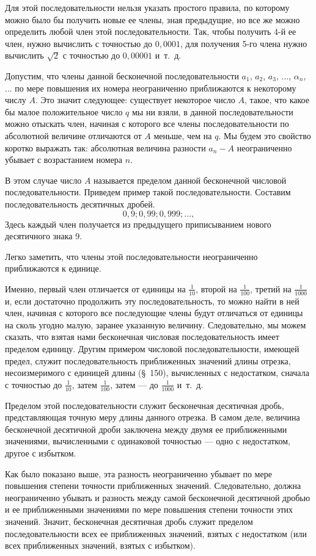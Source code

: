 \documentclass[oneside]{book}
\begin{document}
Для этой последовательности нельзя указать простого правила, по которому можно было бы получить новые ее члены, зная предыдущие, но все же можно определить любой член этой последовательности.
Так, чтобы получить 4-й ее член, нужно вычислить с точностью до $0{,}0001$, для получения 5-го члена нужно вычислить  $\sqrt{2}$  с точностью до $0{,}00001$ и~т.~д.

Допустим, что члены данной бесконечной последовательности $a_1$, $a_2$, $a_3$, ..., $\alpha_n$, ...
по мере повышения их номера неограниченно приближаются к некоторому числу $A$.
Это значит следующее:
существует некоторое число $A$, такое, что какое бы малое положительное число $q$ мы ни взяли, в данной последовательности можно отыскать член, начиная с которого все члены последовательности по абсолютной величине отличаются от $A$ меньше, чем на $q$.
Мы будем это свойство коротко выражать так:
абсолютная величина разности $a_n-A$ неограниченно убывает с возрастанием номера $n$.

В этом случае число $A$ называется пределом данной бесконечной числовой последовательности.
Приведем пример такой последовательности.
Составим последовательность десятичных дробей.
\[0{,}9;
0{,}99;
0{,}999;\dots,\]
Здесь каждый член получается из предыдущего приписыванием нового десятичного знака 9.

Легко заметить, что члены этой последовательности неограниченно приближаются к единице.

Именно, первый член отличается от единицы на $\tfrac1{10}$, 
второй на $\tfrac1{100}$, третий на $\tfrac1{1000}$ и, если достаточно продолжить эту последовательность, то можно найти в ней член, начиная с которого все последующие члены будут отличаться от единицы на сколь угодно малую, заранее указанную величину.
Следовательно, мы можем сказать, что взятая нами бесконечная числовая последовательность имеет пределом единицу.
Другим примером числовой последовательности, имеющей предел, служит последовательность приближенных значений длины отрезка, несоизмеримого с единицей длины (§~150), вычисленных с недостатком, сначала с точностью до $\tfrac1{10}$, затем $\tfrac1{100}$, затем — до $\tfrac1{1000}$ и~т.~д.

Пределом этой последовательности служит бесконечная десятичная дробь, представляющая точную меру длины данного отрезка.
В самом деле, величина бесконечной десятичной дроби заключена между двумя ее приближенными значениями, вычисленными с одинаковой точностью — одно с недостатком, другое с избытком.

Как было показано выше, эта разность неограниченно убывает по мере повышения степени точности приближенных значений.
Следовательно, должна неограниченно убывать и разность между самой бесконечной десятичной дробью и ее приближенными значениями по мере повышения степени точности этих значений.
Значит, бесконечная десятичная дробь служит пределом последовательности всех ее приближенных значений, взятых с недостатком (или всех приближенных значений, взятых с избытком).
\end{document}
